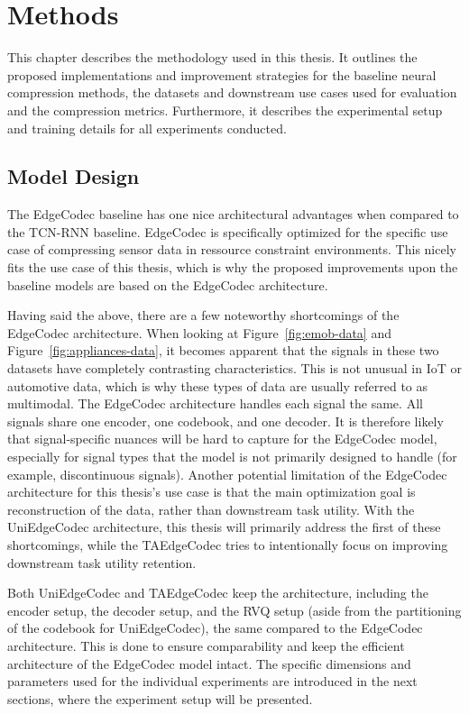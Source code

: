 
\chapter{Methods}
\label{chap:methods}

This chapter describes the methodology used in this thesis. It outlines the proposed implementations and improvement strategies for the baseline neural compression methods, the datasets and downstream use cases used for evaluation and the compression metrics. Furthermore, it describes the experimental setup and training details for all experiments conducted. 

\section{Model Design}

The EdgeCodec baseline has one nice architectural advantages when compared to the TCN-RNN baseline. EdgeCodec is specifically optimized for the specific use case of compressing sensor data in ressource constraint environments. This nicely fits the use case of this thesis, which is why the proposed improvements upon the baseline models are based on the EdgeCodec architecture. 

Having said the above, there are a few noteworthy shortcomings of the EdgeCodec architecture. When looking at Figure~\ref{fig:emob-data} and Figure~\ref{fig:appliances-data}, it becomes apparent that the signals in these two datasets have completely contrasting characteristics. This is not unusual in IoT or automotive data, which is why these types of data are usually referred to as multimodal. The EdgeCodec architecture handles each signal the same. All signals share one encoder, one codebook, and one decoder. It is therefore likely that signal-specific nuances will be hard to capture for the EdgeCodec model, especially for signal types that the model is not primarily designed to handle (for example, discontinuous signals). Another potential limitation of the EdgeCodec architecture for this thesis's use case is that the main optimization goal is reconstruction of the data, rather than downstream task utility. With the UniEdgeCodec architecture, this thesis will primarily address the first of these shortcomings, while the TAEdgeCodec tries to intentionally focus on improving downstream task utility retention. 

Both UniEdgeCodec and TAEdgeCodec keep the architecture, including the encoder setup, the decoder setup, and the RVQ setup (aside from the partitioning of the codebook for UniEdgeCodec), the same compared to the EdgeCodec architecture. This is done to ensure comparability and keep the efficient architecture of the EdgeCodec model intact. The specific dimensions and parameters used for the individual experiments are introduced in the next sections, where the experiment setup will be presented. 

